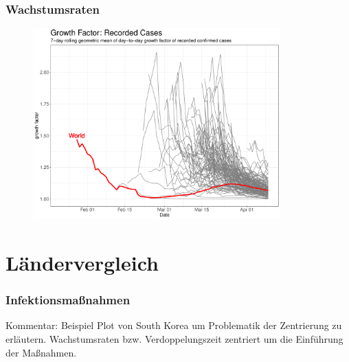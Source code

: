 \documentclass{beamer}
\begin{document}
\begin{frame}
\frametitle{Wachstumsraten}
	\begin{figure}
		\centering
		\includegraphics[width = 270pt]{GF_confirmed}
	\end{figure}
\end{frame}

 \section{Ländervergleich}
\begin{frame}
\frametitle{Infektionsmaßnahmen}
	Kommentar: Beispiel Plot von South Korea um Problematik der Zentrierung zu erläutern. Wachstumsraten bzw. Verdoppelungszeit zentriert um die Einführung der Maßnahmen.
\end{frame}
 
\end{document}
